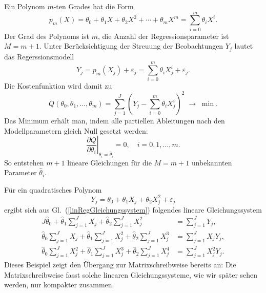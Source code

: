 Ein Polynom $m$-ten Grades hat die Form
\begin{equation}
p_m(X) = \theta_0 + \theta_1 X + \theta_2 X^2 + \cdots + \theta_m X^m
= \sum\limits_{i=0}^{m} \theta_i X^i .
\end{equation}
Der Grad des Polynoms ist $m$, die Anzahl der Regressionsparameter ist $M=m+1$. Unter Berücksichtigung der Streuung der Beobachtungen $Y_j$ lautet das Regerssionsmodell
\begin{equation}
Y_j = p_m(X_j) + \varepsilon_j
= \sum\limits_{i=0}^{m} \theta_i X_j^i + \varepsilon_j .
\label{eq:Kap2ModellglmitResiduenlinearReg}
\end{equation}
Die Kostenfunktion wird damit zu
\begin{equation}
Q(\theta_0,\theta_1,\ldots,\theta_m) =
\sum\limits_{j = 1}^J \left(Y_j - \sum\limits_{i=0}^{m} \theta_i X_j^i\right)^2 \; \longrightarrow \; \min .
\label{eq:Kap2KostenfktlinearReg}
\end{equation}
Das Minimum erhält man, indem alle partiellen Ableitungen nach den Modellparametern gleich Null gesetzt werden:
\begin{equation}
\left. {\frac{\partial Q}{\partial \theta_i }} \right|_{\theta_i = \hat\theta_i} = 0,
\quad i = 0,1,\ldots,m .
\label{linRegGleichungssystem}
\end{equation}
So entstehen $m+1$ lineare Gleichungen für die $M = m+1$ unbekannten Parameter $\hat\theta_i$.

Für ein quadratisches Polynom
\begin{equation}
Y_j = \theta_0 + \theta_1 X_j + \theta_2 X_j^2 + \varepsilon_j
\end{equation}
ergibt sich aus Gl.~(\ref{linRegGleichungssystem}) folgendes lineare Gleichungssystem
\begin{align}
J\hat\theta_0 + \hat\theta_1 \sum\limits_{j=1}^J X_j + \hat\theta_2 \sum\limits_{j=1}^J X_j^2
&= \sum\limits_{j=1}^J Y_j, \nonumber\\
\hat\theta_0 \sum\limits_{j=1}^J X_j + \hat\theta_1 \sum\limits_{j=1}^J X_j^2 + \hat\theta_2 \sum\limits_{j=1}^J X_j^3
&= \sum\limits_{j=1}^J X_jY_j, \\
\hat\theta_0 \sum\limits_{j=1}^J X_j^2 + \hat\theta_1 \sum\limits_{j=1}^J X_j^3 + \hat\theta_2 \sum\limits_{j=1}^J X_j^4
&= \sum\limits_{j=1}^J X_j^2Y_j .\nonumber
\end{align}
Dieses Beispiel zeigt den Übergang zur Matrixschreibweise bereits an: Die Matrixschreibweise fasst solche linearen Gleichungssysteme, wie wir später sehen werden, nur kompakter zusammen.

